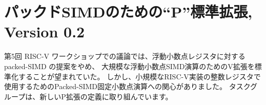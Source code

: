 \begin{comment}
\chapter{``P'' Standard Extension for Packed-SIMD Instructions,
  Version 0.2}
\end{comment}
\chapter{パックドSIMDのための``P''標準拡張, Version 0.2}
\label{sec:packedsimd}

\begin{commentary}
\begin{comment}
  Discussions at the 5th RISC-V workshop indicated a desire to drop
  this packed-SIMD proposal for floating-point registers in favor of
  standardizing on the V extension for large floating-point SIMD
  operations.  However, there was interest in packed-SIMD fixed-point
  operations for use in the integer registers of small RISC-V
  implementations. A task group is working to define the new P
  extension.
\end{comment}
第5回 RISC-V ワークショップでの議論では、浮動小数点レジスタに対する packed-SIMD の提案をやめ、
大規模な浮動小数点SIMD演算のためのV拡張を標準化することが望まれていた。
しかし、小規模なRISC-V実装の整数レジスタで使用するためのPacked-SIMD固定小数点演算への関心がありました。
タスクグループは、新しいP拡張の定義に取り組んでいます。
\end{commentary}

